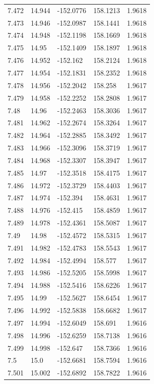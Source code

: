 \begin{tabular}{lllll}
7.472 & 14.944 & -152.0776 & 158.1213 & 1.9618 \\
7.473 & 14.946 & -152.0987 & 158.1441 & 1.9618 \\
7.474 & 14.948 & -152.1198 & 158.1669 & 1.9618 \\
7.475 & 14.95 & -152.1409 & 158.1897 & 1.9618 \\
7.476 & 14.952 & -152.162 & 158.2124 & 1.9618 \\
7.477 & 14.954 & -152.1831 & 158.2352 & 1.9618 \\
7.478 & 14.956 & -152.2042 & 158.258 & 1.9617 \\
7.479 & 14.958 & -152.2252 & 158.2808 & 1.9617 \\
7.48 & 14.96 & -152.2463 & 158.3036 & 1.9617 \\
7.481 & 14.962 & -152.2674 & 158.3264 & 1.9617 \\
7.482 & 14.964 & -152.2885 & 158.3492 & 1.9617 \\
7.483 & 14.966 & -152.3096 & 158.3719 & 1.9617 \\
7.484 & 14.968 & -152.3307 & 158.3947 & 1.9617 \\
7.485 & 14.97 & -152.3518 & 158.4175 & 1.9617 \\
7.486 & 14.972 & -152.3729 & 158.4403 & 1.9617 \\
7.487 & 14.974 & -152.394 & 158.4631 & 1.9617 \\
7.488 & 14.976 & -152.415 & 158.4859 & 1.9617 \\
7.489 & 14.978 & -152.4361 & 158.5087 & 1.9617 \\
7.49 & 14.98 & -152.4572 & 158.5315 & 1.9617 \\
7.491 & 14.982 & -152.4783 & 158.5543 & 1.9617 \\
7.492 & 14.984 & -152.4994 & 158.577 & 1.9617 \\
7.493 & 14.986 & -152.5205 & 158.5998 & 1.9617 \\
7.494 & 14.988 & -152.5416 & 158.6226 & 1.9617 \\
7.495 & 14.99 & -152.5627 & 158.6454 & 1.9617 \\
7.496 & 14.992 & -152.5838 & 158.6682 & 1.9617 \\
7.497 & 14.994 & -152.6049 & 158.691 & 1.9616 \\
7.498 & 14.996 & -152.6259 & 158.7138 & 1.9616 \\
7.499 & 14.998 & -152.647 & 158.7366 & 1.9616 \\
7.5 & 15.0 & -152.6681 & 158.7594 & 1.9616 \\
7.501 & 15.002 & -152.6892 & 158.7822 & 1.9616 \\

\end{tabular}
